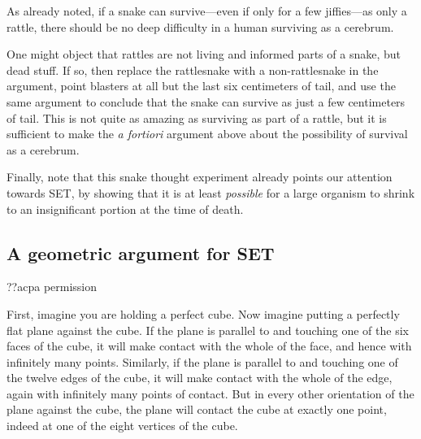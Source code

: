 As already noted, if a snake can survive---even if only for a few jiffies---as only a rattle, there should be no deep 
difficulty in a human surviving as a cerebrum. 

One might object that rattles are not living and informed parts of a snake, but dead stuff. If so, then replace the 
rattlesnake with a non-rattlesnake in the argument, point blasters at all but the last six centimeters of tail, and 
use the same argument to conclude that the snake can survive as just a few centimeters of tail. This is not quite as 
amazing as surviving as part of a rattle, but it is sufficient to make the \textit{a fortiori} argument above about the 
possibility of survival as a cerebrum.

Finally, note that this snake thought experiment already points our attention towards SET, by showing that it is 
at least \textit{possible} for a large organism to shrink to an insignificant portion at the time of death.  

\subsection{A geometric argument for SET}
??acpa permission

First, imagine you are holding a perfect cube. Now imagine putting a perfectly flat plane against the cube. If the 
plane is parallel to and touching one of the six faces of the cube, it will make contact with the whole of the face, 
and hence with infinitely many points. Similarly, if the plane is parallel to and touching one of the twelve edges 
of the cube, it will make contact with the whole of the edge, again with infinitely many points of contact. But in 
every other orientation of the plane against the cube, the plane will contact the cube at exactly one point, indeed at 
one of the eight vertices of the cube. 

